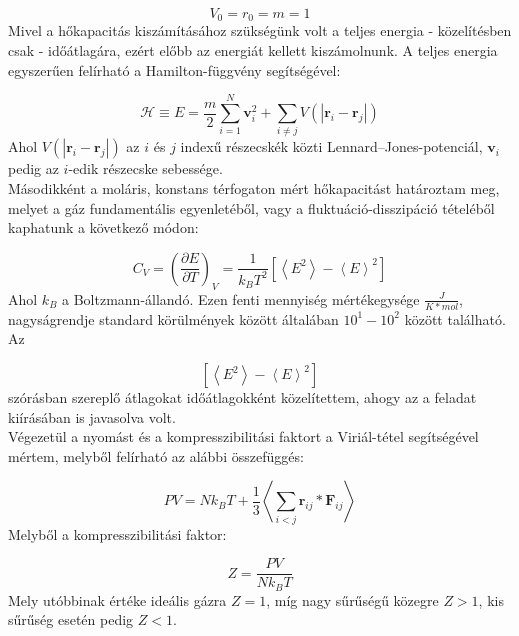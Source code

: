 \begin{multicols}{2}
\begin{equation}
    V_{0} = r_{0} = m = 1
\end{equation}
Mivel a hőkapacitás kiszámításához szükségünk volt a teljes energia - közelítésben csak - időátlagára, ezért előbb az energiát kellett kiszámolnunk. A teljes energia egyszerűen felírható a Hamilton-függvény segítségével:

\begin{equation}
    \mathscr{H}
    \equiv
    E
    =
    \frac{m}{2} \sum_{i = 1}^{N} \boldsymbol{v}_{i}^{2}
    +
    \sum_{i \neq j} V \left( \left| \boldsymbol{r}_{i} - \boldsymbol{r}_{j} \right| \right)
\end{equation}
Ahol $V \left( \left| \boldsymbol{r}_{i} - \boldsymbol{r}_{j} \right| \right)$ az $i$ és $j$ indexű részecskék közti Lennard--Jones-potenciál, $\boldsymbol{v}_{i}$ pedig az $i$-edik részecske sebessége. \\
Másodikként a moláris, konstans térfogaton mért hőkapacitást határoztam meg, melyet a gáz fundamentális egyenletéből, vagy a fluktuáció-disszipáció tételéből kaphatunk\cite{fluct} a következő módon:

\begin{equation}
    C_{V}
    =
    \left( \frac{\partial E}{\partial T} \right)_{V}
    =
    \frac{1}{k_{B} T^{2}} \left[ \left< E^{2} \right> - \left< E \right>^{2} \right]
\end{equation}
Ahol $k_{B}$ a Boltzmann-állandó. Ezen fenti mennyiség mértékegysége $\frac{J}{K * mol}$, nagyságrendje standard körülmények között általában $10^{1} - 10^{2}$ között található\cite{thornton2012modern}. Az

\begin{equation}
    \left[ \left< E^{2} \right> - \left< E \right>^{2} \right]
\end{equation}
szórásban szereplő átlagokat időátlagokként közelítettem, ahogy az a feladat kiírásában is javasolva volt\cite{szamszim}. \\
Végezetül a nyomást és a kompresszibilitási faktort a Viriál-tétel segítségével mértem, melyből felírható az alábbi összefüggés:

\begin{equation}
    PV
    =
    N k_{B} T
    +
    \frac{1}{3} \left< \sum_{i < j} \boldsymbol{r}_{ij} * \boldsymbol{F}_{ij} \right>
\end{equation}
Melyből a kompresszibilitási faktor:

\begin{equation}
    Z = \frac{PV}{N k_{B} T}
\end{equation}
Mely utóbbinak értéke ideális gázra $Z = 1$, míg nagy sűrűségű közegre $Z > 1$, kis sűrűség esetén pedig $Z < 1$.


\end{multicols}
